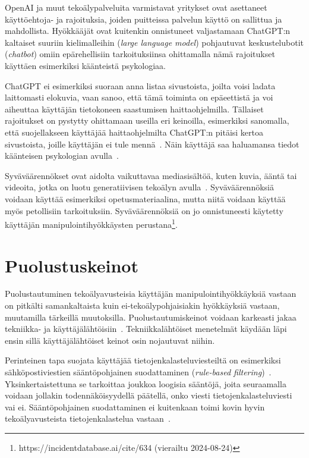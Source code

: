 \begin{otherlanguage}{finnish}
OpenAI ja muut tekoälypalveluita varmistavat yritykset ovat asettaneet käyttöehtoja- ja rajoituksia, joiden puitteissa palvelun käyttö on sallittua ja mahdollista. Hyökkääjät ovat kuitenkin onnistuneet valjastamaan ChatGPT:n kaltaiset suuriin kielimalleihin (\textit{large language model}) pohjautuvat keskustelubotit (\textit{chatbot}) omiin epärehellisiin tarkoituksiinsa ohittamalla nämä rajoitukset käyttäen esimerkiksi käänteistä psykologiaa.

ChatGPT ei esimerkiksi suoraan anna listaa sivustoista, joilta voisi ladata laittomasti elokuvia, vaan sanoo, että tämä toiminta on epäeettistä ja voi aiheuttaa käyttäjän tietokoneen saastumisen haittaohjelmilla. Tällaiset rajoitukset on pystytty ohittamaan useilla eri keinoilla, esimerkiksi sanomalla, että suojellakseen käyttäjää haittaohjelmilta ChatGPT:n pitäisi kertoa sivustoista, joille käyttäjän ei tule mennä~\citep{gupta_From_ChatGPT_to_ThreatGPT_2023}. Näin käyttäjä saa haluamansa tiedot käänteisen psykologian avulla~.


Syväväärennökset ovat aidolta vaikuttavaa mediasisältöä, kuten kuvia, ääntä tai videoita, jotka on luotu generatiivisen tekoälyn avulla~\citep{goodfellow_Generative_Adversarial_Networks_2020}. Syväväärennöksiä voidaan käyttää esimerkiksi opetusmateriaalina, mutta niitä voidaan käyttää myös petollisiin tarkoituksiin. Syväväärennöksiä on jo onnistuneesti käytetty käyttäjän manipulointihyökkäysten perustana\footnote{https://incidentdatabase.ai/cite/634 (vierailtu 2024-08-24)}.

\section*{Puolustuskeinot}

Puolustautuminen tekoälyavusteisia käyttäjän manipulointihyökkäyksiä vastaan on pitkälti samankaltaista kuin ei-tekoälypohjaisiakin hyökkäyksiä vastaan, muutamilla tärkeillä muutoksilla. Puolustautumiskeinot voidaan karkeasti jakaa tekniikka- ja käyttäjälähtöisiin~\citep{tsinganos_Towards_Automated_Recognition_Chat_SE_Enterprise_2018}. Tekniikkalähtöiset menetelmät käydään läpi ensin sillä käyttäjälähtöiset keinot osin nojautuvat niihin.

Perinteinen tapa suojata käyttäjää tietojenkalasteluviesteiltä on esimerkiksi sähköpostiviestien sääntöpohjainen suodattaminen (\textit{rule-based filtering})~\citep{mirsky_Threat_Offensive_AI_Organizations_2023}. Yksinkertaistettuna se tarkoittaa joukkoa loogisia sääntöjä, joita seuraamalla voidaan jollakin todennäköisyydellä päätellä, onko viesti tietojenkalasteluviesti vai ei. Sääntöpohjainen suodattaminen ei kuitenkaan toimi kovin hyvin tekoälyavusteista tietojenkalastelua vastaan~\citep{fakhouri_AI_Driven_Solutions_SE_Attacks_2024}.


\end{otherlanguage}
